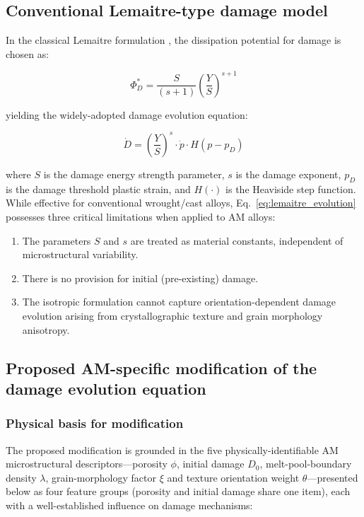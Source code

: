 \documentclass[12pt,a4paper,twocolumn]{article}
\begin{document}
\subsection{Conventional Lemaitre-type damage model}

In the classical Lemaitre formulation \cite{lemaitre1985continuous}, the dissipation potential for damage is chosen as:

\begin{equation}
\Phi^*_D = \frac{S}{(s+1)}\left(\frac{Y}{S}\right)^{s+1}
\label{eq:lemaitre_potential}
\end{equation}

yielding the widely-adopted damage evolution equation:

\begin{equation}
\dot{D} = \left(\frac{Y}{S}\right)^s \cdot \dot{p} \cdot H(p - p_D)
\label{eq:lemaitre_evolution}
\end{equation}

where $S$ is the damage energy strength parameter, $s$ is the damage exponent, $p_D$ is the damage threshold plastic strain, and $H(\cdot)$ is the Heaviside step function. While effective for conventional wrought/cast alloys, Eq.~\eqref{eq:lemaitre_evolution} possesses three critical limitations when applied to AM alloys:

\begin{enumerate}\def\labelenumi{(\roman{enumi})}
    \item The parameters $S$ and $s$ are treated as material constants, independent of microstructural variability.
    \item There is no provision for initial (pre-existing) damage.
    \item The isotropic formulation cannot capture orientation-dependent damage evolution arising from crystallographic texture and grain morphology anisotropy.
\end{enumerate}

\subsection{Proposed AM-specific modification of the damage evolution equation}
\label{sec:am_modification}

\subsubsection{Physical basis for modification}

The proposed modification is grounded in the five physically-identifiable AM microstructural descriptors---porosity $\phi$, initial damage $D_0$, melt-pool-boundary density $\lambda$, grain-morphology factor $\xi$ and texture orientation weight $\theta$---presented below as four feature groups (porosity and initial damage share one item), each with a well-established influence on damage mechanisms:
\end{document}
